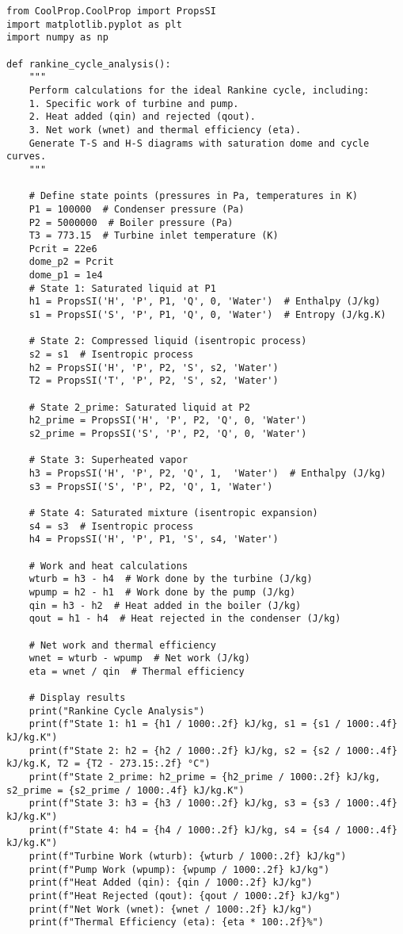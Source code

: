 \documentclass[11pt]{article}
\begin{document}
\begin{lstlisting}[style=custompython, caption=Python code for the Ideal Rankine Cycle]
from CoolProp.CoolProp import PropsSI
import matplotlib.pyplot as plt
import numpy as np

def rankine_cycle_analysis():
    """
    Perform calculations for the ideal Rankine cycle, including:
    1. Specific work of turbine and pump.
    2. Heat added (qin) and rejected (qout).
    3. Net work (wnet) and thermal efficiency (eta).
    Generate T-S and H-S diagrams with saturation dome and cycle curves.
    """

    # Define state points (pressures in Pa, temperatures in K)
    P1 = 100000  # Condenser pressure (Pa)
    P2 = 5000000  # Boiler pressure (Pa)
    T3 = 773.15  # Turbine inlet temperature (K)
    Pcrit = 22e6
    dome_p2 = Pcrit
    dome_p1 = 1e4
    # State 1: Saturated liquid at P1
    h1 = PropsSI('H', 'P', P1, 'Q', 0, 'Water')  # Enthalpy (J/kg)
    s1 = PropsSI('S', 'P', P1, 'Q', 0, 'Water')  # Entropy (J/kg.K)

    # State 2: Compressed liquid (isentropic process)
    s2 = s1  # Isentropic process
    h2 = PropsSI('H', 'P', P2, 'S', s2, 'Water')
    T2 = PropsSI('T', 'P', P2, 'S', s2, 'Water')

    # State 2_prime: Saturated liquid at P2
    h2_prime = PropsSI('H', 'P', P2, 'Q', 0, 'Water')
    s2_prime = PropsSI('S', 'P', P2, 'Q', 0, 'Water')

    # State 3: Superheated vapor
    h3 = PropsSI('H', 'P', P2, 'Q', 1,  'Water')  # Enthalpy (J/kg)
    s3 = PropsSI('S', 'P', P2, 'Q', 1, 'Water')

    # State 4: Saturated mixture (isentropic expansion)
    s4 = s3  # Isentropic process
    h4 = PropsSI('H', 'P', P1, 'S', s4, 'Water')

    # Work and heat calculations
    wturb = h3 - h4  # Work done by the turbine (J/kg)
    wpump = h2 - h1  # Work done by the pump (J/kg)
    qin = h3 - h2  # Heat added in the boiler (J/kg)
    qout = h1 - h4  # Heat rejected in the condenser (J/kg)

    # Net work and thermal efficiency
    wnet = wturb - wpump  # Net work (J/kg)
    eta = wnet / qin  # Thermal efficiency

    # Display results
    print("Rankine Cycle Analysis")
    print(f"State 1: h1 = {h1 / 1000:.2f} kJ/kg, s1 = {s1 / 1000:.4f} kJ/kg.K")
    print(f"State 2: h2 = {h2 / 1000:.2f} kJ/kg, s2 = {s2 / 1000:.4f} kJ/kg.K, T2 = {T2 - 273.15:.2f} °C")
    print(f"State 2_prime: h2_prime = {h2_prime / 1000:.2f} kJ/kg, s2_prime = {s2_prime / 1000:.4f} kJ/kg.K")
    print(f"State 3: h3 = {h3 / 1000:.2f} kJ/kg, s3 = {s3 / 1000:.4f} kJ/kg.K")
    print(f"State 4: h4 = {h4 / 1000:.2f} kJ/kg, s4 = {s4 / 1000:.4f} kJ/kg.K")
    print(f"Turbine Work (wturb): {wturb / 1000:.2f} kJ/kg")
    print(f"Pump Work (wpump): {wpump / 1000:.2f} kJ/kg")
    print(f"Heat Added (qin): {qin / 1000:.2f} kJ/kg")
    print(f"Heat Rejected (qout): {qout / 1000:.2f} kJ/kg")
    print(f"Net Work (wnet): {wnet / 1000:.2f} kJ/kg")
    print(f"Thermal Efficiency (eta): {eta * 100:.2f}%")


\end{lstlisting}
\end{document}
